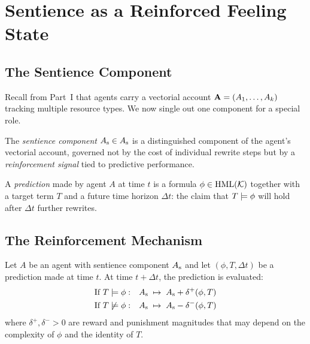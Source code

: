 \chapter{Sentience as a Reinforced Feeling State}
\label{sec:sentience}

\section{The Sentience Component}

Recall from Part~I that agents carry a vectorial account
$\mathbf{A} = (A_1, \ldots, A_k)$ tracking multiple resource types.
We now single out one component for a special role.

\begin{definition}
The \emph{sentience component} $A_{\mathrm{s}} \in A_{\mathrm{s}}$ is a
distinguished component of the agent's vectorial account,
governed not by the cost of individual rewrite steps but by a
\emph{reinforcement signal} tied to predictive performance.
\end{definition}

\begin{definition}[Prediction]
A \emph{prediction} made by agent $A$ at time $t$ is a formula
$\phi \in \mathrm{HML}(\mathcal{K})$ together with a target term $T$ and a
future time horizon $\Delta t$: the claim that $T \models \phi$
will hold after $\Delta t$ further rewrites.
\end{definition}

\section{The Reinforcement Mechanism}

\begin{definition}
Let $A$ be an agent with sentience component $A_{\mathrm{s}}$ and let
$(\phi, T, \Delta t)$ be a prediction made at time $t$.
At time $t + \Delta t$, the prediction is evaluated:
\begin{align}
  \text{If } T \models \phi: &\quad
    A_{\mathrm{s}} \;\mapsto\; A_{\mathrm{s}} + \delta^+(\phi, T) \\
  \text{If } T \not\models \phi: &\quad
    A_{\mathrm{s}} \;\mapsto\; A_{\mathrm{s}} - \delta^-(\phi, T)
\end{align}
where $\delta^+, \delta^- > 0$ are reward and punishment magnitudes
that may depend on the complexity of $\phi$ and the identity of $T$.
\end{definition}

